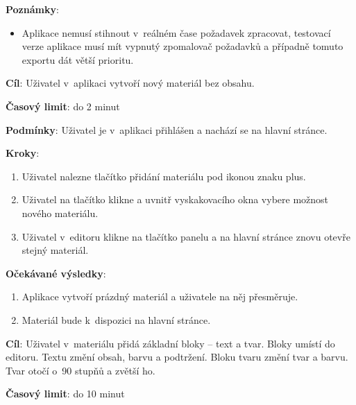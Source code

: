\textbf{Poznámky}:

\begin{itemize}[leftmargin=1.4cm]
    \item Aplikace nemusí stihnout v~reálném čase požadavek zpracovat, testovací verze aplikace musí mít vypnutý zpomalovač požadavků a případně tomuto exportu dát větší prioritu.
\end{itemize}






\vspace{1em}

\textbf{Cíl}: Uživatel v~aplikaci vytvoří nový materiál bez obsahu.

\textbf{Časový limit}: do 2 minut

\textbf{Podmínky}: Uživatel je v~aplikaci přihlášen a nachází se na hlavní stránce.

\textbf{Kroky}:

\begin{enumerate}[leftmargin=1.4cm]
    \item Uživatel nalezne tlačítko přidání materiálu pod ikonou znaku plus.
    \item Uživatel na tlačítko klikne a uvnitř vyskakovacího okna vybere možnost nového materiálu.
    \item Uživatel v~editoru klikne na tlačítko panelu a na hlavní stránce znovu otevře stejný materiál.
\end{enumerate}

\textbf{Očekávané výsledky}:

\begin{enumerate}[leftmargin=1.4cm]
    \item Aplikace vytvoří prázdný materiál a uživatele na něj přesměruje.
    \item Materiál bude k~dispozici na hlavní stránce.
\end{enumerate}






\vspace{1em}

\textbf{Cíl}: Uživatel v~materiálu přidá základní bloky -- text a tvar. Bloky umístí do editoru. Textu změní obsah, barvu a podtržení. Bloku tvaru změní tvar a barvu. Tvar otočí o~90 stupňů a zvětší ho. 

\textbf{Časový limit}: do 10 minut

